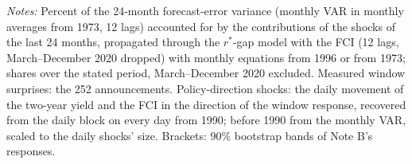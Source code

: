 \begin{table}[tp]\centering\small
\caption{How Much Policy Shocks Explain: Variance Shares at 24 Months}\label{tab:decompshares}
\begin{flushleft}\footnotesize\textit{Notes:} Percent of the 24-month forecast-error variance (monthly VAR in monthly averages from 1973, 12 lags) accounted for by the contributions of the shocks of the last 24 months, propagated through the $r^*$-gap model with the FCI (12 lags, March--December 2020 dropped) with monthly equations from 1996 or from 1973; shares over the stated period, March--December 2020 excluded. Measured window surprises: the 252 announcements. Policy-direction shocks: the daily movement of the two-year yield and the FCI in the direction of the window response, recovered from the daily block on every day from 1990; before 1990 from the monthly VAR, scaled to the daily shocks' size. Brackets: 90\% bootstrap bands of Note B's responses.\end{flushleft}
\end{table}
